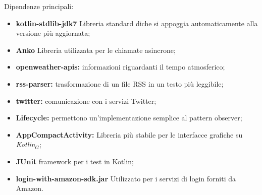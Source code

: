 Dipendenze principali:
\begin{itemize}
	\item \textbf {kotlin-stdlib-jdk7} Libreria standard diche si appoggia automaticamente alla versione più aggiornata;
	\item \textbf {Anko} Libreria utilizzata per le chiamate asincrone;
	\item \textbf{openweather-apis:} informazioni riguardanti il tempo atmosferico;
	\item \textbf{rss-parser:} trasformazione di un file RSS in un testo più leggibile;
	\item \textbf{twitter:} comunicazione con i servizi Twitter;
	\item \textbf{Lifecycle:} permettono un'implementazione semplice al pattern observer;
	\item \textbf{AppCompactActivity:} Libreria più stabile per le interfacce grafiche su \textit{Kotlin$_{G}$};
	\item \textbf{JUnit} framework per i test in Kotlin;
	\item \textbf{login-with-amazon-sdk.jar} Utilizzato per i servizi di login forniti da Amazon.
\end{itemize}
